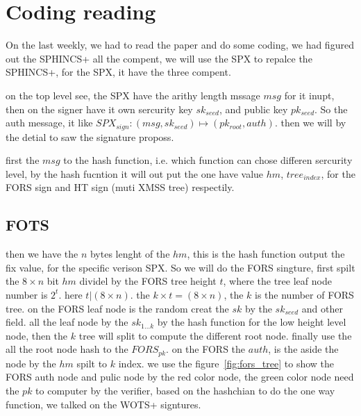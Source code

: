 \documentclass[report]{../../custom}
\begin{document}
\maketitle

\section{Coding reading}

On the last weekly, we had to read the paper and do some coding, we had figured out the SPHINCS+ all the compent, we will use the SPX to repalce the SPHINCS+, for the SPX, it have the three compent.

on the top level see, the SPX have the arithy length mssage $msg$ for it inupt, then on the signer have it own sercurity key $sk_{seed}$, and public key $pk_{seed}$. So the auth message, it like $SPX_{sign}: (msg,sk_{seed}) \mapsto (pk_{root},auth)$. then we will by the detial to saw the signature proposs.

first the $msg$ to the hash function, i.e. which function can chose differen sercurity level, by the hash fucntion it will out put the one have value $hm$, $tree_{index}$, for the FORS sign and HT sign (muti XMSS tree) respectily.

\subsection{FOTS}
then we have the $n$ bytes lenght of the $hm$, this is the hash function output the fix value, for the specific verison SPX. So we will do the FORS singture,
first spilt the $8\times n$ bit $hm$ dividel by the FORS tree height $t$, where the tree leaf node number is $2^t$. here $t | (8\times n)$. the $k\times t=(8\times n)$, the $k$ is the number of FORS tree. on the FORS leaf node is the random creat the $sk$ by the $sk_{seed}$ and other field.
all the leaf node by the $sk_{1\dots k}$ by the hash function for the low height level node, then the $k$ tree will split to compute the different root node. finally use the all the root node hash to the $FORS_{pk}$. on the FORS the $auth$, is the aside the node by the $hm$ spilt to $k$ index.
we use the figure~\ref{fig:fors_tree} to show the FORS auth node and pulic node by the red color node, the green color node need the $pk$ to computer by the verifier, based on the hashchian to do the one way function, we talked on the WOTS+ signtures.
\end{document}
